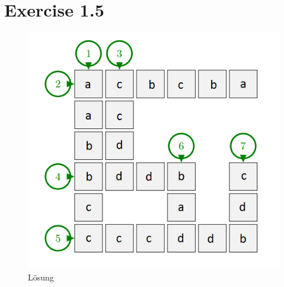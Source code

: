 \documentclass{article}
\begin{document}
\section*{Exercise 1.5}
\begin{figure}[ht]
 \centering
 \includegraphics[scale=0.75]{KreuzwortRaetsel.png}
 \caption{L\"osung}
 \label{figure1}
\end{figure}
\end{document}
